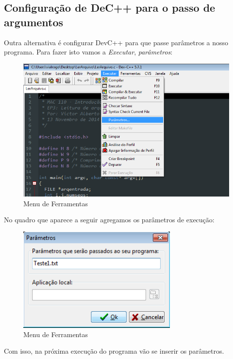 \documentclass[12pt, a4paper]{article}
\begin{document}
\subsection*{Configuração de DeC++ para o passo de argumentos}
Outra alternativa é configurar DevC++ para que passe parâmetros a nosso programa.
Para fazer isto vamos a \emph{Executar}, \emph{parâmetros}:

\begin{figure}[H]
  \centering
  \includegraphics[width=140mm]{Imagens/3.png}
  \caption{Menu de Ferramentas}
\label{fig:3}
\end{figure}

No quadro que aparece a seguir agregamos os parâmetros de execução:

\begin{figure}[H]
  \centering
  \includegraphics[width=80mm]{Imagens/4.png}
  \caption{Menu de Ferramentas}
\label{fig:4}
\end{figure}

Com isso, na próxima execução do programa vão se inserir os parâmetros.
\end{document}
